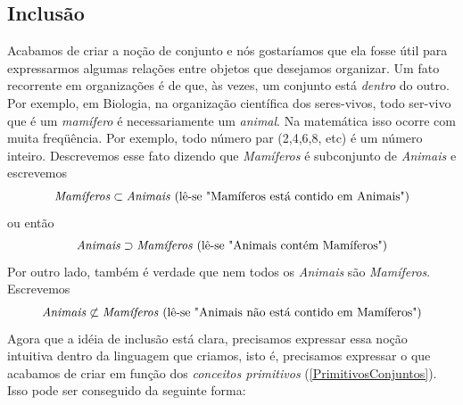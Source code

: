 \subsection{Inclusão}
Acabamos de criar a noção de conjunto e nós gostaríamos que ela fosse útil para expressarmos algumas relações entre objetos que desejamos organizar. Um fato recorrente em organizações é de que, às vezes, um conjunto está \textit{dentro} do outro. Por exemplo, em Biologia, na organização científica dos seres-vivos, todo ser-vivo que é um \emph{mamífero} é necessariamente um \emph{animal}. Na matemática isso ocorre com muita freqüência. Por exemplo, todo número par (2,4,6,8, etc) é um número inteiro. Descrevemos esse fato dizendo que \emph{Mamíferos} é subconjunto de \emph{Animais} e escrevemos $$\text{\emph{Mamíferos}} \subset \text{\emph{Animais} (lê-se "Mamíferos está contido em Animais")}$$ou então$$\text{\emph{Animais}} \supset \text{\emph{Mamíferos} (lê-se "Animais contém Mamíferos")} $$Por outro lado, também é verdade que nem todos os \emph{Animais} são \emph{Mamíferos}. Escrevemos $$\text{\emph{Animais}} \not \subset \text{\emph{Mamíferos} (lê-se "Animais não está contido em Mamíferos")}$$Agora que a idéia de inclusão está clara, precisamos expressar essa noção intuitiva dentro da linguagem que criamos, isto é, precisamos expressar o que acabamos de criar em função dos \textit{conceitos primitivos} (\ref{PrimitivosConjuntos}). Isso pode ser conseguido da seguinte forma:

	
